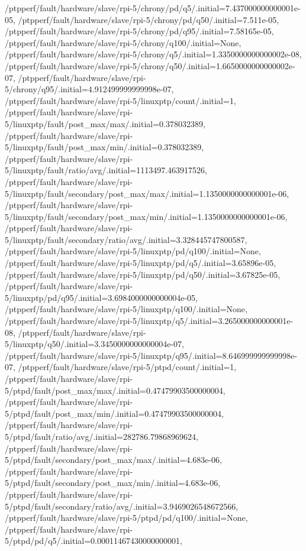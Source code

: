 {    /ptpperf/fault/hardware/slave/rpi-5/chrony/pd/q5/.initial=7.437000000000001e-05,
    /ptpperf/fault/hardware/slave/rpi-5/chrony/pd/q50/.initial=7.511e-05,
    /ptpperf/fault/hardware/slave/rpi-5/chrony/pd/q95/.initial=7.58165e-05,
    /ptpperf/fault/hardware/slave/rpi-5/chrony/q100/.initial=None,
    /ptpperf/fault/hardware/slave/rpi-5/chrony/q5/.initial=1.3350000000000002e-08,
    /ptpperf/fault/hardware/slave/rpi-5/chrony/q50/.initial=1.6650000000000002e-07,
    /ptpperf/fault/hardware/slave/rpi-5/chrony/q95/.initial=4.912499999999998e-07,
    /ptpperf/fault/hardware/slave/rpi-5/linuxptp/count/.initial=1,
    /ptpperf/fault/hardware/slave/rpi-5/linuxptp/fault/post_max/max/.initial=0.378032389,
    /ptpperf/fault/hardware/slave/rpi-5/linuxptp/fault/post_max/min/.initial=0.378032389,
    /ptpperf/fault/hardware/slave/rpi-5/linuxptp/fault/ratio/avg/.initial=1113497.463917526,
    /ptpperf/fault/hardware/slave/rpi-5/linuxptp/fault/secondary/post_max/max/.initial=1.1350000000000001e-06,
    /ptpperf/fault/hardware/slave/rpi-5/linuxptp/fault/secondary/post_max/min/.initial=1.1350000000000001e-06,
    /ptpperf/fault/hardware/slave/rpi-5/linuxptp/fault/secondary/ratio/avg/.initial=3.328445747800587,
    /ptpperf/fault/hardware/slave/rpi-5/linuxptp/pd/q100/.initial=None,
    /ptpperf/fault/hardware/slave/rpi-5/linuxptp/pd/q5/.initial=3.65896e-05,
    /ptpperf/fault/hardware/slave/rpi-5/linuxptp/pd/q50/.initial=3.67825e-05,
    /ptpperf/fault/hardware/slave/rpi-5/linuxptp/pd/q95/.initial=3.6984000000000004e-05,
    /ptpperf/fault/hardware/slave/rpi-5/linuxptp/q100/.initial=None,
    /ptpperf/fault/hardware/slave/rpi-5/linuxptp/q5/.initial=3.265000000000001e-08,
    /ptpperf/fault/hardware/slave/rpi-5/linuxptp/q50/.initial=3.3450000000000004e-07,
    /ptpperf/fault/hardware/slave/rpi-5/linuxptp/q95/.initial=8.646999999999998e-07,
    /ptpperf/fault/hardware/slave/rpi-5/ptpd/count/.initial=1,
    /ptpperf/fault/hardware/slave/rpi-5/ptpd/fault/post_max/max/.initial=0.47479903500000004,
    /ptpperf/fault/hardware/slave/rpi-5/ptpd/fault/post_max/min/.initial=0.47479903500000004,
    /ptpperf/fault/hardware/slave/rpi-5/ptpd/fault/ratio/avg/.initial=282786.79868969624,
    /ptpperf/fault/hardware/slave/rpi-5/ptpd/fault/secondary/post_max/max/.initial=4.683e-06,
    /ptpperf/fault/hardware/slave/rpi-5/ptpd/fault/secondary/post_max/min/.initial=4.683e-06,
    /ptpperf/fault/hardware/slave/rpi-5/ptpd/fault/secondary/ratio/avg/.initial=3.9469026548672566,
    /ptpperf/fault/hardware/slave/rpi-5/ptpd/pd/q100/.initial=None,
    /ptpperf/fault/hardware/slave/rpi-5/ptpd/pd/q5/.initial=0.00011467430000000001,
}
